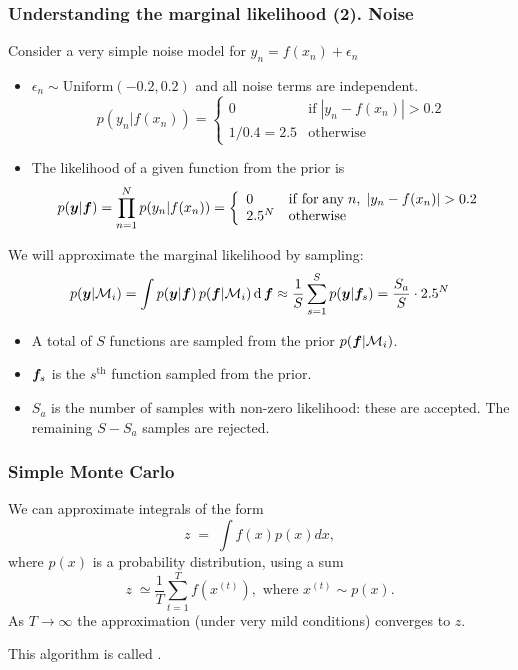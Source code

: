 \begin{frame}
\frametitle{Understanding the marginal likelihood (2). Noise}

Consider a very simple noise model for $y_n = f(x_n) + \epsilon_n$
\begin{itemize}
\item $\epsilon_n\sim\mathrm{Uniform}(-0.2, 0.2)$ and all noise terms are independent.
\[
p(y_n|f(x_n))= \left\{ 
\begin{array}{ll}  0 & \mathrm{if\; } |y_n-f(x_n)|>0.2\\
  1/0.4=2.5 &  \mathrm{otherwise}
\end{array}
 \right.
\]
\item The likelihood of a given function from the prior is 
%
\[
p(\bfy|\bff)=\prod_{n=1}^Np(y_n|f(x_n))=
\left\{
\begin{array}{ll}
0 &\mathrm{if\;for\;any\;}n, \; |y_n-f(x_n)|>0.2 \\
2.5^N &\mathrm{otherwise}
\end{array}
\right.
\]
%
\end{itemize}

We will approximate the marginal likelihood by  sampling:
%
\[
p(\bm y|\mathcal{M}_i)=\int p(\bm y|\bm f)\,p(\bm f|\mathcal{M}_i)\,\mathbf{\mathrm{d}}\,\bm f
\approx \frac{1}{S}\sum_{s=1}^{S} p(\bm y|\bm f_s) = \frac{S_a}{S}\cdot2.5^N
\]
%
\vspace*{-2ex}
\begin{itemize}
\item A total of $S$ functions are sampled from the prior $p(\bm f|\mathcal{M}_i)$. 
\item $\bm f_s$ is the $s^\mathrm{th}$ function sampled from the prior.
\item $S_a$ is the number of samples with non-zero likelihood: these are accepted. The 
remaining $S-S_a$ samples are rejected.
\end{itemize}

\end{frame}



\begin{frame}
\frametitle{Simple Monte Carlo}

We can approximate integrals of the form
\[
z\;=\;\int f(x) p(x) dx,
\]
where $p(x)$ is a probability distribution, using a sum
\[
z\;\simeq\frac{1}{T}\sum_{t=1}^T f(x^{(t)}),\text{\ \ where\ \ }x^{(t)}\sim p(x).
\]
As $T\rightarrow \infty$ the approximation (under very mild conditions)
converges to $z$.

This algorithm is called .
\end{frame}


